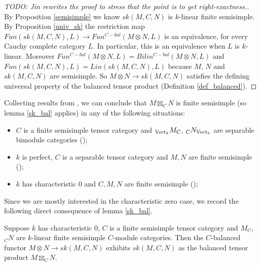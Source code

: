 \begin{proof}
  [TODO: Jin rewrites the proof to stress that the point is to get right-exactness.]
  By Proposition \ref{semisimple} we know $sk(M,C,N)$ is $k$-linear finite semisimple. By Proposition \ref{univ_sk} the restriction map
  $Fun(sk(M,C,N),L)\to Fun^{C-bal}(M\otimes N,L)$ is an equivalence, for every
  Cauchy complete category $L$. In particular, this is an equivalence when $L$
  is $k$-linear.
  Moreover $Fun^{C-bal}(M\otimes N, L)=Bilin^{C-bal}(M\otimes N, L)$ and $Fun(sk(M,C,N),L)=Lin(sk(M,C,N),L)$ because
  $M$, $N$ and $sk(M,C,N)$ are semisimple. So $M\otimes N\to sk(M,C,N)$ satisfies the defining
  universal property of the balanced tensor product (Definition \ref{def_balanced}).
\end{proof}

\begin{remark}\label{semisimple_douglas/dualizable-tensor-categories}
  Collecting results from \cite{douglas/dualizable-tensor-categories}, we can
  conclude that $M\boxtimes_C N$ is finite semisimple (so lemma \ref{sk_bal} applies) in any of the following
  situations:
  \begin{itemize}
    \item $C$ is a finite semisimple tensor category and $_{\operatorname{Vect}_k}M_C$,
    $_{C}N_{\operatorname{Vect}_k}$ are separable bimodule categories (\cite[Proposition 2.5.3,
    Theorem 2.5.5]{douglas/dualizable-tensor-categories});
    \item $k$ is perfect, $C$ is a separable tensor category and $M,N$ are
    finite semisimple (\cite[Proposition
    2.5.10]{douglas/dualizable-tensor-categories});
    \item $k$ has characteristic $0$ and $C,M,N$ are finite semisimple
    (\cite[Corollary 2.6.9]{douglas/dualizable-tensor-categories});
  \end{itemize}
\end{remark}

Since we are mostly interested in the characteristic zero case, we record the following direct consequence of lemma \ref{sk_bal}.

\begin{theorem}
   Suppose $k$ has characteristic $0$, $C$ is a finite semisimple tensor category and $M_C$,$_{C}N$ are $k$-linear finite semisimple $C$-module categories. Then the $C$-balanced functor $M\otimes N\to sk(M,C,N)$ exhibits
   $sk(M,C,N)$ as the balanced tensor product $M\boxtimes_C N$.
\end{theorem}

